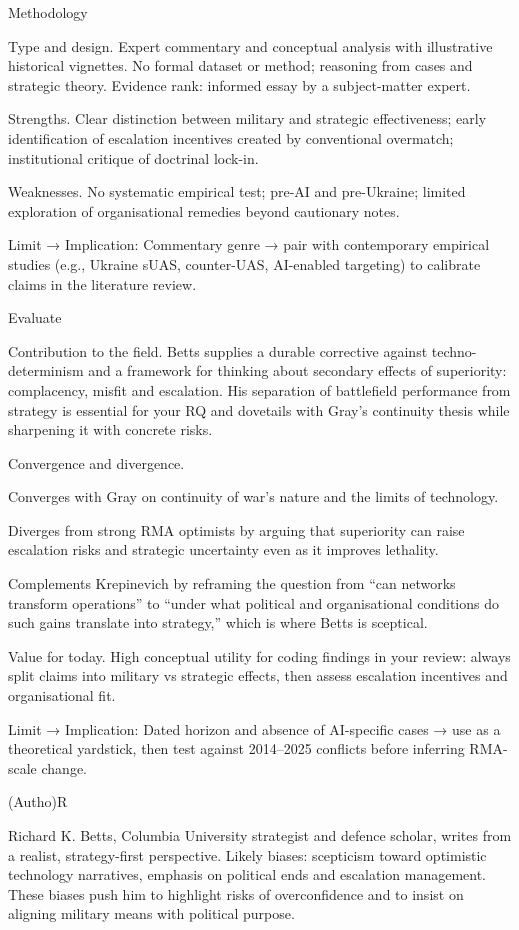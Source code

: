 Methodology

Type and design. Expert commentary and conceptual analysis with illustrative historical vignettes. No formal dataset or method; reasoning from cases and strategic theory. Evidence rank: informed essay by a subject-matter expert.

Strengths. Clear distinction between military and strategic effectiveness; early identification of escalation incentives created by conventional overmatch; institutional critique of doctrinal lock-in.

Weaknesses. No systematic empirical test; pre-AI and pre-Ukraine; limited exploration of organisational remedies beyond cautionary notes.

Limit → Implication: Commentary genre → pair with contemporary empirical studies (e.g., Ukraine sUAS, counter-UAS, AI-enabled targeting) to calibrate claims in the literature review.

Evaluate

Contribution to the field. Betts supplies a durable corrective against techno-determinism and a framework for thinking about secondary effects of superiority: complacency, misfit and escalation. His separation of battlefield performance from strategy is essential for your RQ and dovetails with Gray’s continuity thesis while sharpening it with concrete risks.

Convergence and divergence.

Converges with Gray on continuity of war’s nature and the limits of technology.

Diverges from strong RMA optimists by arguing that superiority can raise escalation risks and strategic uncertainty even as it improves lethality.

Complements Krepinevich by reframing the question from “can networks transform operations” to “under what political and organisational conditions do such gains translate into strategy,” which is where Betts is sceptical.

Value for today. High conceptual utility for coding findings in your review: always split claims into military vs strategic effects, then assess escalation incentives and organisational fit.

Limit → Implication: Dated horizon and absence of AI-specific cases → use as a theoretical yardstick, then test against 2014–2025 conflicts before inferring RMA-scale change.

(Autho)R

Richard K. Betts, Columbia University strategist and defence scholar, writes from a realist, strategy-first perspective. Likely biases: scepticism toward optimistic technology narratives, emphasis on political ends and escalation management. These biases push him to highlight risks of overconfidence and to insist on aligning military means with political purpose.

